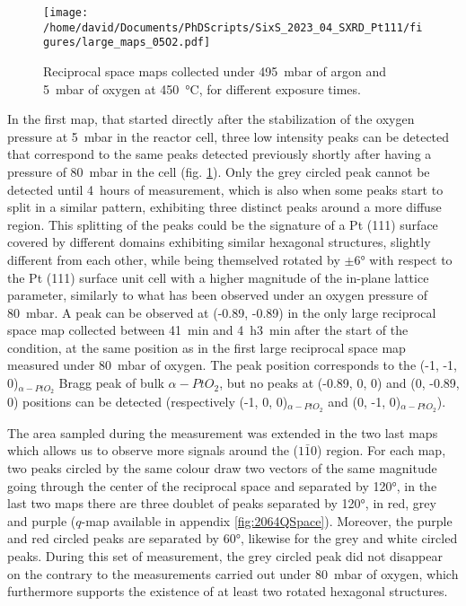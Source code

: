 \begin{figure}[!htb]
    \centering
    \texttt{[image: /home/david/Documents/PhDScripts/SixS\_2023\_04\_SXRD\_Pt111/figures/large\_maps\_05O2.pdf]}
    \caption{
        Reciprocal space maps collected under \qty{495}{\milli\bar} of argon and \qty{5}{\milli\bar} of oxygen at \qty{450}{\degreeCelsius}, for different exposure times.
    }
    \label{fig:LargeMapsPt111LowOxygen}
\end{figure}

In the first map, that started directly after the stabilization of the oxygen pressure at \qty{5}{\milli\bar} in the reactor cell, three low intensity peaks can be detected that correspond to the same peaks detected previously shortly after having a pressure of \qty{80}{\milli\bar} in the cell (fig. \ref{fig:LargeMapsPt111LowOxygen}).
Only the grey circled peak cannot be detected until \qty{4}{hours} of measurement, which is also when some peaks start to split in a similar pattern, exhibiting three distinct peaks around a more diffuse region.
This splitting of the peaks could be the signature of a Pt (111) surface covered by different domains exhibiting similar hexagonal structures, slightly different from each other, while being themselved rotated by $\pm \ang{6}$ with respect to the Pt (111) surface unit cell with a higher magnitude of the in-plane lattice parameter, similarly to what has been observed under an oxygen pressure of \qty{80}{\milli\bar}.
A peak can be observed at (-0.89, -0.89) in the only large reciprocal space map collected between \qty{41}{\minute} and \qty{4}{\hour}\qty{3}{\minute} after the start of the condition, at the same position as in the first large reciprocal space map measured under \qty{80}{\milli\bar} of oxygen.
The peak position corresponds to the (-1, -1, 0)$_{\alpha-PtO_2}$ Bragg peak of bulk $\alpha-PtO_2$, but no peaks at (-0.89, 0, 0) and (0, -0.89, 0) positions can be detected (respectively (-1, 0, 0)$_{\alpha-PtO_2}$ and (0, -1, 0)$_{\alpha-PtO_2}$).

The area sampled during the measurement was extended in the two last maps which allows us to observe more signals around the ($1\bar{1}0$) region.
For each map, two peaks circled by the same colour draw two vectors of the same magnitude going through the center of the reciprocal space and separated by \ang{120}, in the last two maps there are three doublet of peaks separated by \ang{120}, in red, grey and purple ($q$-map available in appendix \ref{fig:2064QSpace}).
Moreover, the purple and red circled peaks are separated by \ang{60}, likewise for the grey and white circled peaks.
During this set of measurement, the grey circled peak did not disappear on the contrary to the measurements carried out under \qty{80}{\milli\bar} of oxygen, which furthermore supports the existence of at least two rotated hexagonal structures.

